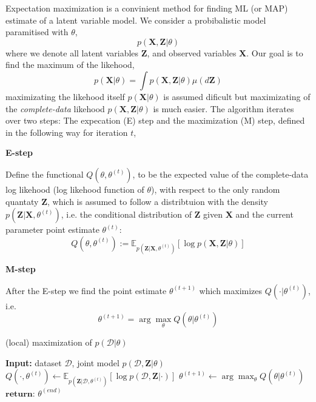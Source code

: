 \begin{testexample2}
    Expectation maximization is a convinient method for finding ML (or MAP) estimate of a 
    latent variable model. We consider a probibalistic model paramitised with $\theta$, 
    $$p(\textbf{X}, \textbf{Z}|\theta)$$ where we denote all latent variables \textbf{Z}, and
    observed variables \textbf{X}. Our goal is to find the maximum of the likehood, 
    $$p(\textbf{X}|\theta) = \int p(\textbf{X}, \textbf{Z}| \theta) \mu(d\textbf{Z})$$
    maximizating the likehood itself $p(\textbf{X}|\theta)$ is assumed dificult 
    but maximizating of the \textit{complete-data} likehood $p(\textbf{X}, \textbf{Z}|\theta)$
    is much easier. The algorithm iterates over two steps: The expecation (E) step and the maximization (M) step, 
    defined in the following way for iteration $t$, 
    
    \textbf{E-step}

    Define the functional $Q(\theta,\theta^{(t)})$, to be the expected value of the complete-data 
    log likehood (log likehood function of $\theta$), with respect to the only random quantaty $\textbf{Z}$,
    which is assumed to follow a distribtuion with the density $p(\textbf{Z}|\textbf{X}, \theta^{(t)})$,
    i.e. the conditional distribution of \textbf{Z} given \textbf{X} and the current parameter point estimate
    $\theta^{(t)}$: 
    $$Q(\theta,\theta^{(t)}) := \mathbb{E}_{p(\textbf{Z}|\textbf{X}, \theta^{(t)})}[\log p(\textbf{X}, \textbf{Z}|\theta)]$$

    \textbf{M-step}

    After the E-step we find the point estimate $\theta^{(t+1)}$ which maximizes $Q(\cdot|\theta^{(t)})$, i.e.
    $$\theta^{(t+1)} = \arg\max_{\theta} Q(\theta|\theta^{(t)})$$

    \begin{algorithm}[H]
        \caption*{(local) maximization of $p(\mathcal{D}|\theta)$}\label{EM}
        \begin{algorithmic}
        \State \textbf{Input:} dataset $\mathcal{D}$, joint model $p(\mathcal{D}, \textbf{Z}|\theta)$
            \State $Q(\cdot, \theta^{(t)}) \gets \mathbb{E}_{p(\textbf{Z}|\mathcal{D}, \theta^{(t)})}[\log p(\mathcal{D}, \textbf{Z}|\cdot)]$ 
            \State $\theta^{(t+1)} \gets \arg\max_{\theta} Q(\theta|\theta^{(t)})$ 
        \EndWhile
        \State $\textbf{return: } \theta^{(end)}$
    \end{algorithmic}
    \end{algorithm}


\end{testexample2}
